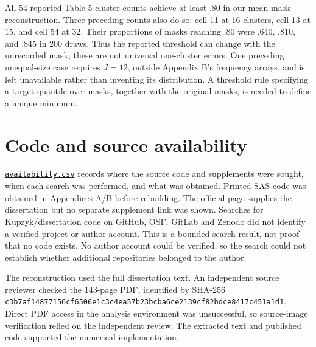 \documentclass[11pt]{article}
\begin{document}
All 54 reported Table 5 cluster counts \citep[p.~97]{kupzyk2011} achieve at least .80 in our mean-mask reconstruction. Three preceding counts also do so: cell 11 at 16 clusters, cell 13 at 15, and cell 54 at 32. Their proportions of masks reaching .80 were .640, .810, and .845 in 200 draws. Thus the reported threshold can change with the unrecorded mask; these are not universal one-cluster errors. One preceding unequal-size case requires $J=12$, outside Appendix B's frequency arrays, and is left unavailable rather than inventing its distribution. A threshold rule specifying a target quantile over masks, together with the original masks, is needed to define a unique minimum.
\section{Code and source availability}
\href{https://github.com/alectionary/vibe-math/blob/master/formalization/kupzyk-power-assumptions/notes/availability.csv}{\nolinkurl{availability.csv}} records where the source code and supplements were sought, when each search was performed, and what was obtained. Printed SAS code was obtained in Appendices A/B before rebuilding. The official page supplies the dissertation but no separate supplement link was shown. Searches for Kupzyk/dissertation code on GitHub, OSF, GitLab and Zenodo did not identify a verified project or author account. This is a bounded search result, not proof that no code exists. No author account could be verified, so the search could not establish whether additional repositories belonged to the author.

The reconstruction used the full dissertation text. An independent source reviewer checked the 143-page PDF, identified by SHA-256 \texttt{c3b7af14\allowbreak{}877156cf\allowbreak{}6506e1c3\allowbreak{}c4ea57b2\allowbreak{}3bcba6ce\allowbreak{}2139cf82\allowbreak{}bdce8417\allowbreak{}c451a1d1}. Direct PDF access in the analysis environment was unsuccessful, so source-image verification relied on the independent review. The extracted text and published code supported the numerical implementation.
\end{document}
